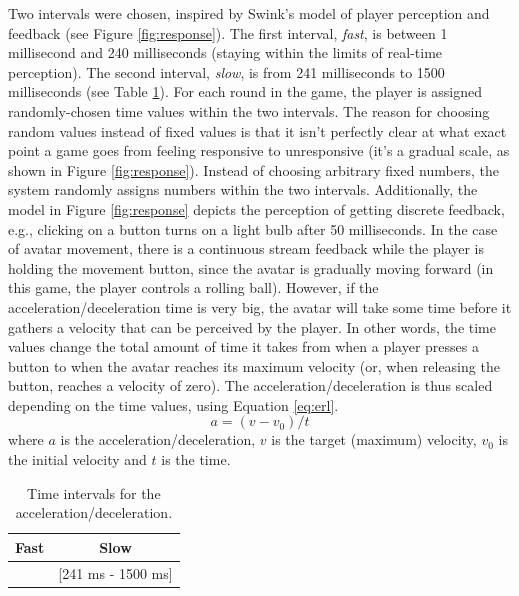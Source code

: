 Two intervals were chosen, inspired by Swink's model of player perception and feedback (see Figure \ref{fig:response}). The first interval, \textit{fast}, is between 1 millisecond and 240 milliseconds (staying within the limits of real-time perception). The second interval, \textit{slow}, is from 241 milliseconds to 1500 milliseconds (see Table \ref{tab:time}). For each round in the game, the player is assigned randomly-chosen time values within the two intervals. The reason for choosing random values instead of fixed values is that it isn't perfectly clear at what exact point a game goes from feeling responsive to unresponsive (it's a gradual scale, as shown in Figure \ref{fig:response}). Instead of choosing arbitrary fixed numbers, the system randomly assigns numbers within the two intervals. Additionally, the model in Figure \ref{fig:response} depicts the perception of getting discrete feedback, e.g., clicking on a button turns on a light bulb after 50 milliseconds. In the case of avatar movement, there is a continuous stream feedback while the player is holding the movement button, since the avatar is gradually moving forward (in this game, the player controls a rolling ball). However, if the acceleration/deceleration time is very big, the avatar will take some time before it gathers a velocity that can be perceived by the player. In other words, the time values change the total amount of time it takes from when a player presses a button to when the avatar reaches its maximum velocity (or, when releasing the button, reaches a velocity of zero). The acceleration/deceleration is thus scaled depending on the time values, using Equation \ref{eq:erl}.
\begin{equation} \label{eq:erl} %
a = (v - v_0)/t
\end{equation} 
where $a$ is the acceleration/deceleration, $v$ is the target (maximum) velocity, $v_0$ is the initial velocity and $t$ is the time.

\begin{table}[htbp]
\small
\centering
\begin{tabular}{|c|c|}
\hline \textbf{Fast}
& \textbf{Slow}\\\hline
[1 ms - 240 ms]
& [241 ms - 1500 ms]
\\\hline
\end{tabular}
\caption{Time intervals for the acceleration/deceleration.}
\label{tab:time}
\end{table}

